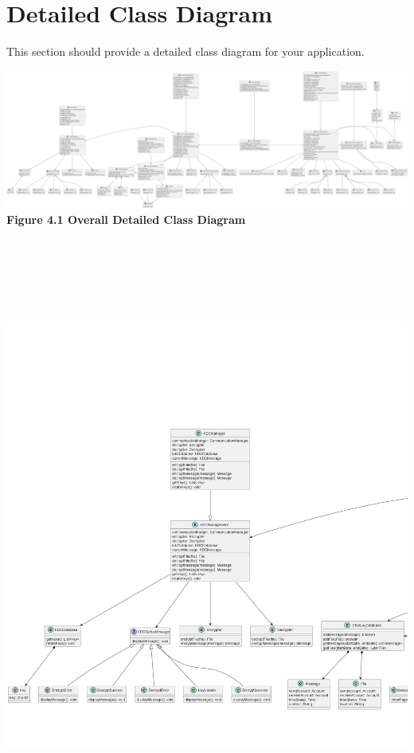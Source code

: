 \documentclass[]{article}
\begin{document}
\section{Detailed Class Diagram}
\label{sec:detailed_class_diagram}
This section should provide a detailed class diagram for your application.
\begin{center}
	\includegraphics[width=\textwidth]{../images/ClassDiagram/FullClass.png}
	\textbf{Figure 4.1 Overall Detailed Class Diagram}
	\includegraphics[width=\textwidth,height=8in]{../images/ClassDiagram/left.png}

\end{center}
\end{document}
